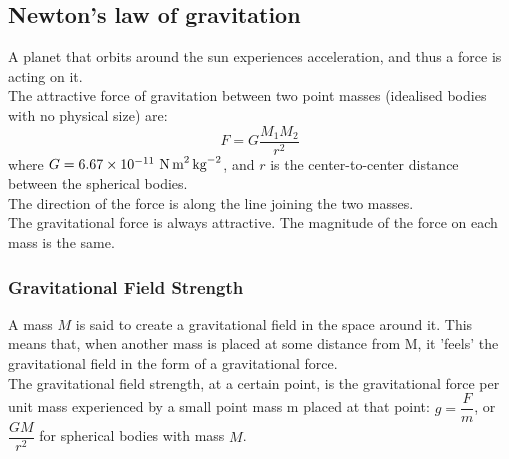 \subsection{Newton's law of gravitation}
A planet that orbits around the sun experiences acceleration, and thus a force is acting on it.\\
The attractive force of gravitation between two point masses (idealised bodies with no physical size) are:
\[F=G\dfrac{M_1M_2}{r^2}\]
where $G=6.67\times 10^{-11}\ \text{N\,m}^{2}\,\text{kg}^{-2}$, and $r$ is the center-to-center distance between the spherical bodies.\\
The direction of the force is along the line joining the two masses.\\
The gravitational force is always attractive. The magnitude of the force on each mass is the same.
\subsubsection*{Gravitational Field Strength}
A mass $M$ is said to create a gravitational field in the space around it. This means that, when another mass is placed at some distance from M, it 'feels' the gravitational field in the form of a gravitational force.\\
The gravitational field strength, at a certain point, is the gravitational force per unit mass experienced by a small point mass m placed at that point: $g=\dfrac{F}{m}$, or $\dfrac{GM}{r^2}$ for spherical bodies with mass $M$.\\
\begin{center}
\end{center}
